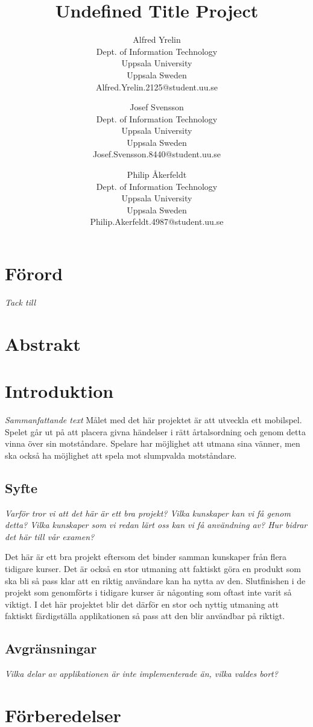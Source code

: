 \documentclass[11pt,a4paper]{article}
\author{
Alfred Yrelin \\
\textup{Dept. of Information Technology}\\
\textup{Uppsala University}\\
\textup{Uppsala Sweden}\\
\textup{Alfred.Yrelin.2125@student.uu.se}
\and 
Josef Svensson \\
\textup{Dept. of Information Technology}\\
\textup{Uppsala University}\\
\textup{Uppsala Sweden}\\
\textup{Josef.Svensson.8440@student.uu.se}
\and
Philip Åkerfeldt \\
\textup{Dept. of Information Technology}\\
\textup{Uppsala University}\\
\textup{Uppsala Sweden}\\
\textup{Philip.Akerfeldt.4987@student.uu.se}
}
\title{Undefined Title Project}
\begin{document}
\maketitle

\newpage
\section{Förord}
\textit{Tack till}
\newpage

\section{Abstrakt}


\tableofcontents

\section{Introduktion}
\textit{Sammanfattande text}
Målet med det här projektet är att utveckla ett mobilspel. Spelet går ut på att placera givna händelser i rätt årtalsordning och genom detta vinna över sin motståndare. Spelare har möjlighet att utmana sina vänner, men ska också ha möjlighet att spela mot slumpvalda motståndare. 

\subsection{Syfte}
\textit{Varför tror vi att det här är ett bra projekt?
Vilka kunskaper kan vi få genom detta?
Vilka kunskaper som vi redan lärt oss kan vi få användning av?
Hur bidrar det här till vår examen?}


Det här är ett bra projekt eftersom det binder samman kunskaper från flera tidigare kurser. Det är också en stor utmaning att faktiskt göra en produkt som ska bli så pass klar att en riktig användare kan ha nytta av den. Slutfinishen i de projekt som genomförts i tidigare kurser är någonting som oftast inte varit så viktigt. I det här projektet blir det därför en stor och nyttig utmaning att faktiskt färdigställa applikationen så pass att den blir användbar på riktigt. 

\subsection{Avgränsningar}
\textit{Vilka delar av applikationen är inte implementerade än, vilka valdes bort?}

\section{Förberedelser}
\end{document}
